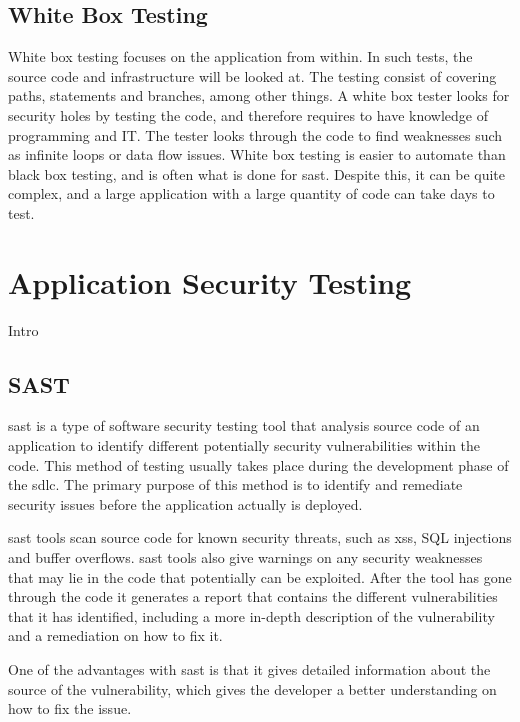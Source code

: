 \subsection{White Box Testing}
White box testing focuses on the application from within. In such tests, the source code and infrastructure will be looked at. The testing consist of covering paths, statements and branches, among other things. A white box tester looks for security holes by testing the code, and therefore requires to have knowledge of programming and IT. The tester looks through the code to find weaknesses such as infinite loops or data flow issues. White box testing is easier to automate than black box testing, and is often what is done for \acrlong{sast}. Despite this, it can be quite complex, and a large application with a large quantity of code can take days to test. \cite{whitebox}
\newpage

\section{Application Security Testing}
Intro

\subsection{SAST}
\acrlong{sast} is a type of software security testing tool that analysis source code of an application to identify different potentially security vulnerabilities within the code. This method of testing usually takes place during the development phase of the \acrlong{sdlc}. The primary purpose of this method is to identify and remediate security issues before the application actually is deployed. \cite{sast}

\acrshort{sast} tools scan source code for known security threats, such as \acrlong{xss}, SQL injections and buffer overflows. \acrshort{sast} tools also give warnings on any security weaknesses that may lie in the code that potentially can be exploited. After the tool has gone through the code it generates a report that contains the different vulnerabilities that it has identified, including a more in-depth description of the vulnerability and a remediation on how to fix it. 

One of the advantages with \acrshort{sast} is that it gives detailed information about the source of the vulnerability, which gives the developer a better understanding on how to fix the issue. 

